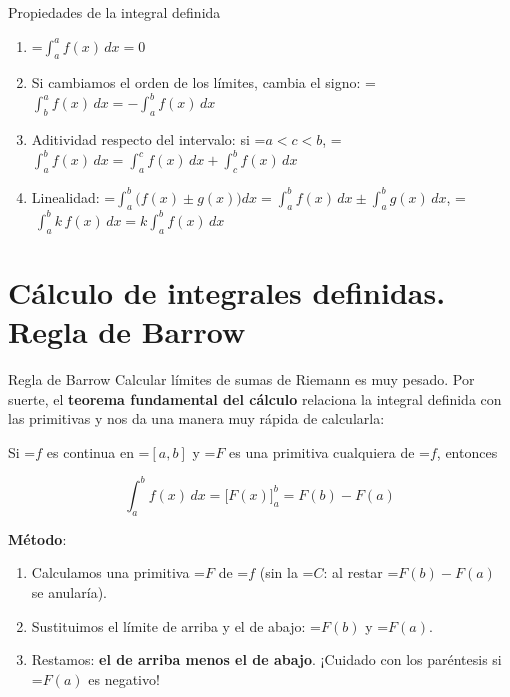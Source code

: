 \documentclass[11pt,a4paper]{article}
\newcommand{\lt}{<}\newcommand{\gt}{>}
\newcommand{\fmm}[1]{\setbox0=\hbox{$#1$}\ifdim\wd0>\linewidth\[#1\]\else\mbox{\box0}\fi}
\newcommand{\fmuline}[1]{\textbf{\color{fmaccent}#1}}
\begin{document}
  
\begin{fmprop}{Propiedades de la integral definida}
\begin{enumerate}
\item \fmm{\displaystyle\int_a^a f(x)\,dx=0}
\item Si cambiamos el orden de los límites, cambia el signo: \fmm{\displaystyle\int_b^a f(x)\,dx=-\int_a^b f(x)\,dx}
\item Aditividad respecto del intervalo: si \fmm{a\lt c\lt b}, \fmm{\displaystyle\int_a^b f(x)\,dx=\int_a^c f(x)\,dx+\int_c^b f(x)\,dx}
\item Linealidad: \fmm{\displaystyle\int_a^b\big(f(x)\pm g(x)\big)dx=\int_a^b f(x)\,dx\pm\int_a^b g(x)\,dx}, \fmm{\ \displaystyle\int_a^b k\,f(x)\,dx=k\int_a^b f(x)\,dx}
\end{enumerate}
\end{fmprop}

  
\section{Cálculo de integrales definidas. Regla de Barrow}\hypertarget{sec5}{}

  

  
\begin{fmdef}{Regla de Barrow}
Calcular límites de sumas de Riemann es muy pesado. Por suerte, el \textbf{teorema fundamental del cálculo} relaciona la integral definida con las primitivas y nos da una manera muy rápida de calcularla:

      

Si \fmm{f} es continua en \fmm{[a,b]} y \fmm{F} es una primitiva cualquiera de \fmm{f}, entonces

      
\[\int_a^b f(x)\,dx=\Big[F(x)\Big]_a^b=F(b)-F(a)\]

      

\fmuline{Método}:

      
\begin{enumerate}
\item Calculamos una primitiva \fmm{F} de \fmm{f} (sin la \fmm{C}: al restar \fmm{F(b)-F(a)} se anularía).
\item Sustituimos el límite de arriba y el de abajo: \fmm{F(b)} y \fmm{F(a)}.
\item Restamos: \textbf{el de arriba menos el de abajo}. ¡Cuidado con los paréntesis si \fmm{F(a)} es negativo!
\end{enumerate}
\end{fmdef}
\end{document}
